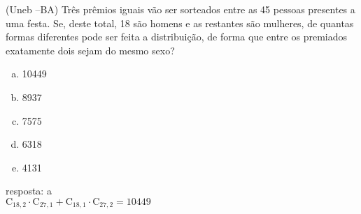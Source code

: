\begin{ex}
 (Uneb –BA) Três prêmios iguais vão ser sorteados entre as 45 pessoas presentes a uma festa. Se, deste total, 18 são homens  e as restantes são mulheres, de quantas formas diferentes pode ser feita a distribuição, de forma que entre os premiados exatamente dois sejam do mesmo sexo?
   \begin{enumerate}[(a)]
   \item 10449
   \item 8937
   \item 7575
   \item 6318
   \item 4131
   \end{enumerate}
    \begin{sol}
      resposta: a \\
      $\mathrm{C}_{{18},2}\cdot\mathrm{C}_{{27},1}+\mathrm{C}_{{18},1}\cdot\mathrm{C}_{{27},2}=10449$
    \end{sol}
\end{ex}